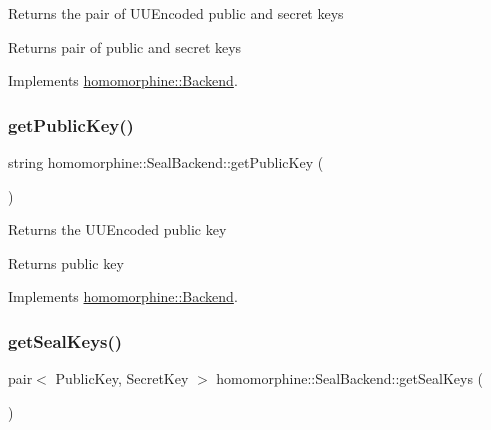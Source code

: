 Returns the pair of U\+U\+Encoded public and secret keys

\begin{DoxyReturn}{Returns}
pair of public and secret keys 
\end{DoxyReturn}


Implements \mbox{\hyperlink{classhomomorphine_1_1_backend_a4c1062db09f76c74640f70b451d70729}{homomorphine\+::\+Backend}}.

\mbox{\label{classhomomorphine_1_1_seal_backend_aa2dce269303eaa73c62dbfacce66dc1a}} 
\subsubsection{\texorpdfstring{getPublicKey()}{getPublicKey()}}
{\footnotesize\ttfamily string homomorphine\+::\+Seal\+Backend\+::get\+Public\+Key (\begin{DoxyParamCaption}{ }\end{DoxyParamCaption})\hspace{0.3cm}{\ttfamily [virtual]}}

Returns the U\+U\+Encoded public key

\begin{DoxyReturn}{Returns}
public key 
\end{DoxyReturn}


Implements \mbox{\hyperlink{classhomomorphine_1_1_backend_a8bba422ac5b13e77030a884cfd6a0463}{homomorphine\+::\+Backend}}.

\mbox{\label{classhomomorphine_1_1_seal_backend_af12f7bbba973928bd2944b837f4202c4}} 
\subsubsection{\texorpdfstring{getSealKeys()}{getSealKeys()}}
{\footnotesize\ttfamily pair$<$ Public\+Key, Secret\+Key $>$ homomorphine\+::\+Seal\+Backend\+::get\+Seal\+Keys (\begin{DoxyParamCaption}{ }\end{DoxyParamCaption})}

